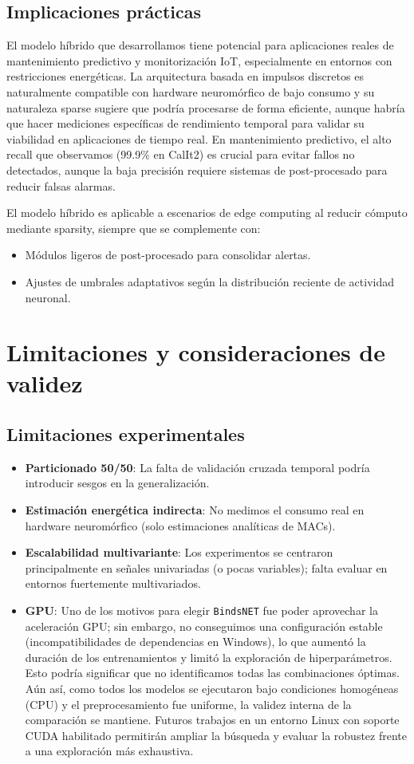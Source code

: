 \subsection{Implicaciones prácticas}
El modelo híbrido que desarrollamos tiene potencial para aplicaciones reales de mantenimiento predictivo y monitorización IoT, especialmente en entornos con restricciones energéticas. La arquitectura basada en impulsos discretos es naturalmente compatible con hardware neuromórfico de bajo consumo y su naturaleza sparse sugiere que podría procesarse de forma eficiente, aunque habría que hacer mediciones específicas de rendimiento temporal para validar su viabilidad en aplicaciones de tiempo real. En mantenimiento predictivo, el alto recall que observamos (99.9\% en CalIt2) es crucial para evitar fallos no detectados, aunque la baja precisión requiere sistemas de post-procesado para reducir falsas alarmas.

El modelo híbrido es aplicable a escenarios de edge computing al reducir cómputo mediante sparsity, siempre que se complemente con:
\begin{itemize}
    \item Módulos ligeros de post-procesado para consolidar alertas.
    \item Ajustes de umbrales adaptativos según la distribución reciente de actividad neuronal.
\end{itemize}

\section{Limitaciones y consideraciones de validez}
\subsection{Limitaciones experimentales}
\begin{itemize}
    \item \textbf{Particionado 50/50}: La falta de validación cruzada temporal podría introducir sesgos en la generalización.
    \item \textbf{Estimación energética indirecta}: No medimos el consumo real en hardware neuromórfico (solo estimaciones analíticas de MACs).
    \item \textbf{Escalabilidad multivariante}: Los experimentos se centraron principalmente en señales univariadas (o pocas variables); falta evaluar en entornos fuertemente multivariados.
    \item \textbf{GPU}: Uno de los motivos para elegir \texttt{BindsNET} fue poder aprovechar la aceleración GPU; sin embargo, no conseguimos una configuración estable (incompatibilidades de dependencias en Windows), lo que aumentó la duración de los entrenamientos y limitó la exploración de hiperparámetros. Esto podría significar que no identificamos todas las combinaciones óptimas. Aún así, como todos los modelos se ejecutaron bajo condiciones homogéneas (CPU) y el preprocesamiento fue uniforme, la validez interna de la comparación se mantiene. Futuros trabajos en un entorno Linux con soporte CUDA habilitado permitirán ampliar la búsqueda y evaluar la robustez frente a una exploración más exhaustiva.
\end{itemize}


